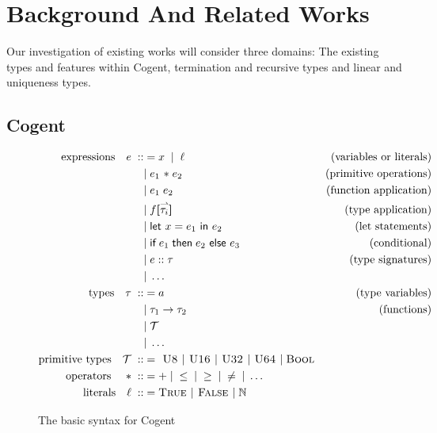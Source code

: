 \chapter{Background And Related Works}\label{ch:background}

Our investigation of existing works will consider three domains: The existing types and features
within Cogent, termination and recursive types and linear and uniqueness types.

\section{Cogent}
\begin{figure}
    \centering

    \begin{align*}
    \text{expressions}\quad e\; ::&= x\;\; |\;\; \ell & \text{(variables or literals)} \\
                &|\; e_1 \text{ \textasteriskcentered }\; e_2 & \text{(primitive operations)} \\
                &|\; e_1\; e_2 & \text{(function application)} \\
                &|\; f\textbf{[}\harpoon{\tau_i}\textbf{]} & \text{(type application)} \\
                &|\; \textsf{let } x = e_1 \textsf{ in } e_2 & \text{(let statements)} \\
                &|\; \textsf{if}\; e_1\; \textsf{then}\; e_2 \textsf{ else } e_3 & \text{(conditional)} \\
                &|\; e :: \tau & \text{(type signatures)} \\
                &|\; \dots \\
        \text{types}\quad \tau\; ::&= a & \text{(type variables)} \\
              &|\; \tau_1 \rightarrow \tau_2 & \text{(functions)} \\
              &|\; \mathcal{T} \\
              &|\; \dots \\
        \text{primitive types}\quad \mathcal{T}\; ::&= \textsc{ U8 } | \textsc{ U16 } | \textsc{ U32 } | \textsc{ U64 } |\; \textsc{Bool} \\
        \text{operators \ \ \ \textasteriskcentered }\; ::&= +\; |\; \leq\; |\; \geq\; |\; \neq\; |\; \dots \\
        \text{literals}\quad \ell\; ::&= \textsc{True } | \textsc{ False } |\; \mathbb{N}  \\
    \end{align*}

    \caption{The basic syntax for Cogent~\citep{LiamThesis}}
    \label{fig:cogentGrammar}
\end{figure}

